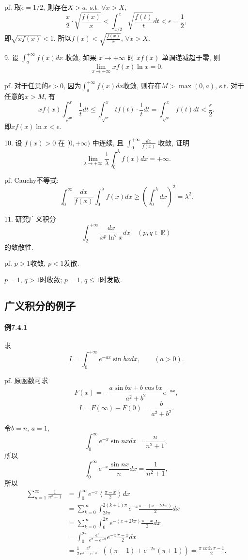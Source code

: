 pf. 取$\epsilon=1/2$, 则存在$X>a$, s.t. $\forall x>X$, 
\[
\frac{x}{2}\cdot\sqrt{\frac{f(x)}{x}}<\int_{x/2}^{x}\sqrt{\frac{f(t)}{t}}dt<\epsilon=\frac{1}{2},
\]
即$\sqrt{xf(x)}<1$. 所以$f(x)<\sqrt{\frac{f(x)}{x}}$, $\forall x>X$.

9. 设 $\int_{a}^{+\infty}f(x)dx$ 收敛, 如果 $x\rightarrow+\infty$ 时 $xf(x)$
单调递减趋于零, 则 
\[
\lim_{x\rightarrow+\infty}xf(x)\ln x=0.
\]

pf. 对于任意的$\epsilon>0$, 因为$\int_{a}^{+\infty}f(x)dx$收敛, 则存在$M>\max(0,a)$,
s.t. 对于任意的$x>M$, 有
\[
xf(x)\int_{\sqrt{x}}^{x}\frac{1}{t}dt\le\int_{\sqrt{x}}^{x}tf(t)\cdot\frac{1}{t}dt=\int_{\sqrt{x}}^{x}f(t)dt<\frac{\epsilon}{2}.
\]
即$xf(x)\ln x<\epsilon$.

10. 设 $f(x)>0$ 在 $[0,+\infty)$ 中连续, 且 $\int_{0}^{+\infty}\frac{dx}{f(x)}$
收敛, 证明 
\[
\lim_{\lambda\rightarrow+\infty}\frac{1}{\lambda}\int_{0}^{\lambda}f(x)dx=+\infty.
\]

pf. Cauchy不等式:
\[
\int_{0}^{\infty}\frac{dx}{f(x)}\int_{0}^{\lambda}f(x)dx\ge\left(\int_{0}^{\lambda}dx\right)^{2}=\lambda^{2}.
\]

11. 研究广义积分 
\[
\int_{2}^{+\infty}\frac{dx}{x^{p}\ln^{q}x}dx\quad(p,q\in\mathbb{R})
\]
的敛散性.

pf. $p>1$收敛, $p<1$发散.

$p=1$, $q>1$时收敛; $p=1$, $q\le1$时发散.

\subsection{广义积分的例子}

\paragraph{例7.4.1}

求
\[
I=\int_{0}^{+\infty}e^{-ax}\sin bxdx,\qquad(a>0).
\]

pf. 原函数可求
\[
F(x)=-\frac{a\sin bx+b\cos bx}{a^{2}+b^{2}}e^{-ax},
\]
\[
I=F(\infty)-F(0)=\frac{b}{a^{2}+b^{2}}.
\]

令$b=n$, $a=1$, 
\[
\int_{0}^{\infty}e^{-x}\sin nxdx=\frac{n}{n^{2}+1},
\]
所以
\[
\int_{0}^{\infty}e^{-x}\frac{\sin nx}{n}dx=\frac{1}{n^{2}+1},
\]
所以
\begin{align*}
\sum_{n=1}^{\infty}\frac{1}{n^{2}+1} & =\int_{0}^{\infty}e^{-x}\left\langle \frac{\pi-x}{2}\right\rangle dx\\
 & =\sum_{k=0}^{\infty}\int_{2k\pi}^{2(k+1)\pi}e^{-x}\frac{\pi-(x-2k\pi)}{2}dx\\
 & =\sum_{k=0}^{\infty}\int_{0}^{2\pi}e^{-(x+2k\pi)}\frac{\pi-x}{2}dx\\
 & =\int_{0}^{2\pi}\frac{e^{\pi}}{e^{\pi}-e^{-\pi}}e^{-x}\frac{\pi-x}{2}dx\\
 & =\frac{1}{2}\frac{e^{\pi}}{e^{\pi}-e^{-\pi}}\cdot\left((\pi-1)+e^{-2\pi}(\pi+1)\right)=\frac{\pi\coth\pi-1}{2}.
\end{align*}


